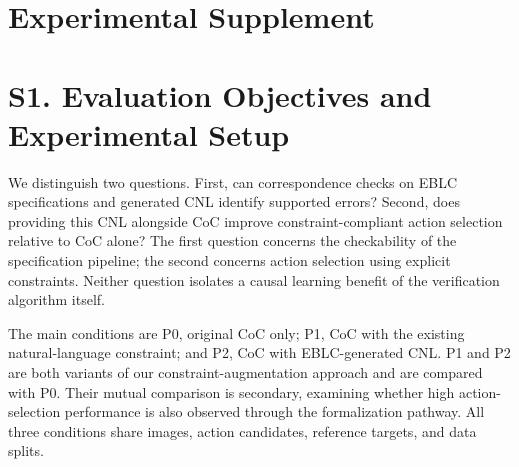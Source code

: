\documentclass[11pt,a4paper]{article}
\begin{document}
\section*{Experimental Supplement}

\section*{S1. Evaluation Objectives and Experimental Setup}

We distinguish two questions. First, can correspondence checks on EBLC specifications and generated CNL identify supported errors? Second, does providing this CNL alongside CoC improve constraint-compliant action selection relative to CoC alone? The first question concerns the checkability of the specification pipeline; the second concerns action selection using explicit constraints. Neither question isolates a causal learning benefit of the verification algorithm itself.\par

The main conditions are P0, original CoC only; P1, CoC with the existing natural-language constraint; and P2, CoC with EBLC-generated CNL. P1 and P2 are both variants of our constraint-augmentation approach and are compared with P0. Their mutual comparison is secondary, examining whether high action-selection performance is also observed through the formalization pathway. All three conditions share images, action candidates, reference targets, and data splits.\par
\end{document}
